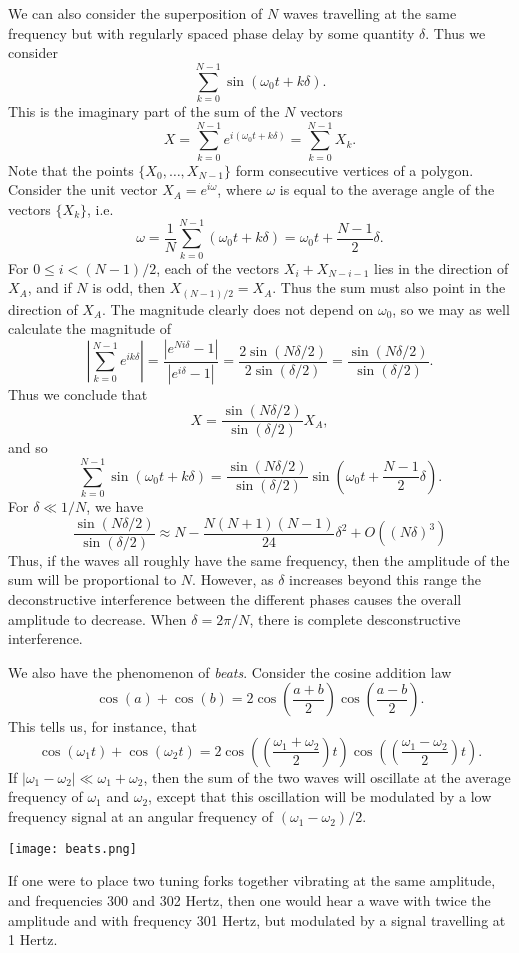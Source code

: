 We can also consider the superposition of $N$ waves travelling at the same frequency but with regularly spaced phase delay by some quantity $\delta$. Thus we consider
%
\[ \sum_{k = 0}^{N-1} \sin(\omega_0 t + k \delta). \]
%
This is the imaginary part of the sum of the $N$ vectors
%
\[ X = \sum_{k = 0}^{N-1} e^{i (\omega_0 t + k \delta)} = \sum_{k = 0}^{N-1} X_k. \]
%
Note that the points $\{ X_0, \dots, X_{N-1} \}$ form consecutive vertices of a polygon. Consider the unit vector $X_A = e^{i \omega}$, where $\omega$ is equal to the average angle of the vectors $\{ X_k \}$, i.e.
%
\[ \omega = \frac{1}{N} \sum_{k = 0}^{N-1} (\omega_0 t + k \delta) = \omega_0 t + \frac{N-1}{2} \delta. \]
%
For $0 \leq i < (N-1)/2$, each of the vectors $X_i + X_{N-i-1}$ lies in the direction of $X_A$, and if $N$ is odd, then $X_{(N-1)/2} = X_A$. Thus the sum must also point in the direction of $X_A$. The magnitude clearly does not depend on $\omega_0$, so we may as well calculate the magnitude of
%
\[ \left| \sum_{k = 0}^{N-1} e^{i k \delta} \right| = \frac{|e^{N i \delta} - 1|}{|e^{i \delta} - 1|} = \frac{2 \sin(N \delta /2)}{2 \sin(\delta / 2)} = \frac{\sin(N\delta/2)}{\sin(\delta/2)}. \]
%
Thus we conclude that
%
\[ X = \frac{\sin(N\delta/2)}{\sin(\delta/2)} X_A, \]
%
and so
%
\[ \sum_{k = 0}^{N-1} \sin(\omega_0 t + k \delta) = \frac{\sin(N\delta/2)}{\sin(\delta/2)} \sin \left( \omega_0 t + \frac{N-1}{2} \delta \right). \]
%
For $\delta \ll 1/N$, we have
%
\[ \frac{\sin(N \delta/2)}{\sin(\delta/2)} \approx N - \frac{N (N + 1)(N - 1)}{24} \delta^2 + O( (N \delta)^3 ) \]
%
Thus, if the waves all roughly have the same frequency, then the amplitude of the sum will be proportional to $N$. However, as $\delta$ increases beyond this range the deconstructive interference between the different phases causes the overall amplitude to decrease. When $\delta = 2 \pi / N$, there is complete desconstructive interference.

We also have the phenomenon of \emph{beats}. Consider the cosine addition law
%
\[ \cos(a) + \cos(b) = 2 \cos \left( \frac{a + b}{2} \right) \cos \left( \frac{a - b}{2} \right). \]
%
This tells us, for instance, that
%
\[ \cos(\omega_1 t) + \cos(\omega_2 t) = 2 \cos \left( \left( \frac{\omega_1 + \omega_2}{2} \right) t \right) \cos \left( \left( \frac{\omega_1 - \omega_2}{2} \right) t \right). \]
%
If $|\omega_1 - \omega_2| \ll \omega_1 + \omega_2$, then the sum of the two waves will oscillate at the average frequency of $\omega_1$ and $\omega_2$, except that this oscillation will be modulated by a low frequency signal at an angular frequency of $(\omega_1 - \omega_2) / 2$.
%
\begin{center}
\texttt{[image: beats.png]}
\end{center}
%
If one were to place two tuning forks together vibrating at the same amplitude, and frequencies 300 and 302 Hertz, then one would hear a wave with twice the amplitude and with frequency 301 Hertz, but modulated by a signal travelling at 1 Hertz.

